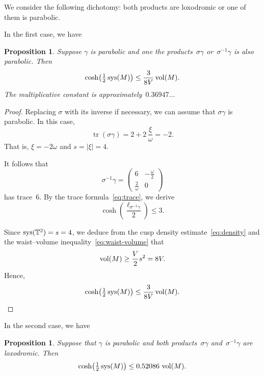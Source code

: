 \documentclass[11pt,reqno]{amsart}
\newtheorem{proposition}[theorem]{Proposition}
\theoremstyle{definition}
\numberwithin{equation}{section}
\newcommand\T {{\mathbb T}}
\DeclareMathOperator{\vol}{{\rm vol}}
\DeclareMathOperator{\sys}{{\rm sys}}
\DeclareMathOperator{\tr}{tr}
\numberwithin{equation}{section}
\begin{document}
\medskip

We consider the following dichotomy: both products are loxodromic or one of them is parabolic.

\medskip

In the first case, we have


\begin{proposition} \label{prop:ARparabolic1}
Suppose $\gamma$ is parabolic and one the products~$\sigma \gamma$ or~$\sigma^{-1} \gamma$ is also parabolic.
Then
\[
\cosh \!\left(\tfrac{1}{2} \sys(M) \right) \leq \frac{3}{8 V} \vol(M).
\]
The multiplicative constant is approximately~$0.36947...$
\end{proposition}

\begin{proof}
Replacing $\sigma$ with its inverse if necessary, we can assume that $\sigma \gamma$ is parabolic.
In this case,
\[
\tr(\sigma \gamma) = 2+2 \, \frac{\xi}{\omega} = -2.
\]
That is, $\xi=-2\omega$ and $s=|\xi|=4$.

It follows that
\[
\sigma^{-1} \gamma = 
\begin{pmatrix}
6 & -\frac{\omega}{2} \\
\frac{2}{\omega} & 0
\end{pmatrix}
\]
has trace~$6$.
By the trace formula~\eqref{eq:trace}, we derive
\[
\cosh \left( \frac{\ell_{\sigma^{-1} \gamma}}{2} \right) \leq 3.
\]

Since $\sys(\T^2)=s=4$, we deduce from the cusp density estimate~\eqref{eq:density} and the waist--volume inequality~\eqref{eq:waist-volume} that
\[
\vol(M) \geq \frac{V}{2} s^2 = 8 V.
\]
Hence,
\[
\cosh \!\left(\tfrac{1}{2} \sys(M) \right) \leq \frac{3}{8 V} \vol(M).
\]
\end{proof}

In the second case, we have

\begin{proposition} \label{prop:ARparabolic2}
Suppose that $\gamma$ is parabolic and both products~$\sigma \gamma$ and~$\sigma^{-1} \gamma$ are loxodromic.
Then
\[
\cosh \!\left(\tfrac{1}{2} \sys(M) \right) \leq 0.52086 \, \vol(M).
\]
\end{proposition}
\end{document}
